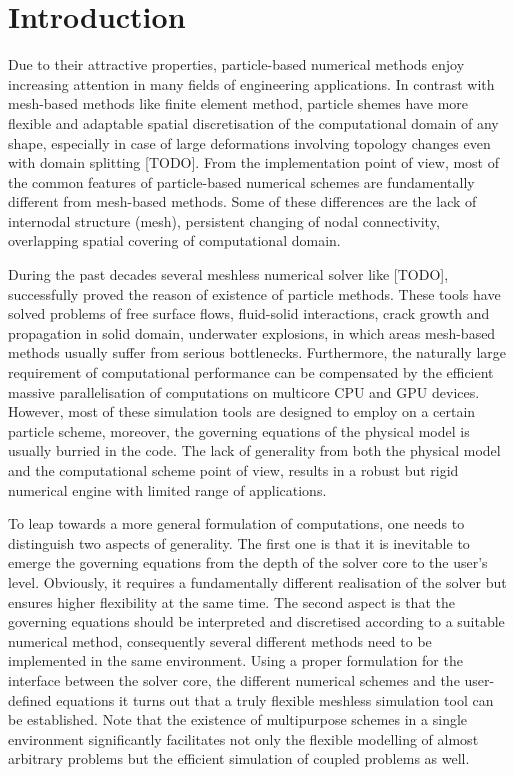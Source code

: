 \documentclass[a4paper,12pt,openany]{book}
\theoremstyle{break}
\begin{document}
\section{Introduction}
Due to their attractive properties, particle-based numerical methods enjoy increasing attention in many fields of engineering applications. In contrast with mesh-based methods  like finite element method, particle shemes have more flexible and adaptable spatial discretisation of the computational domain of any shape, especially in case of large deformations involving topology changes even with domain splitting [TODO].
From the implementation point of view, most of the common features of particle-based numerical schemes are fundamentally different from mesh-based methods. Some of these differences are the lack of internodal structure (mesh), persistent changing of nodal connectivity, overlapping spatial covering of computational domain.

During the past decades several meshless numerical solver like [TODO], successfully proved the reason of existence of particle methods. These tools have solved problems of free surface flows, fluid-solid interactions, crack growth and propagation in solid domain, underwater explosions, in which areas mesh-based methods usually suffer from serious bottlenecks. Furthermore, the naturally large requirement of computational performance can be compensated by the efficient massive parallelisation of computations on multicore CPU and GPU devices. However, most of these simulation tools are designed to employ on a certain particle scheme, moreover, the governing equations of the physical model is usually burried in the code. The lack of generality from both the physical model and the computational scheme point of view, results in a robust but rigid numerical engine with limited range of applications. %

To leap towards a more general formulation of computations, one needs to distinguish two aspects of generality. The first one is that it is inevitable to emerge the governing equations from the depth of the solver core to the user's level. Obviously, it requires a fundamentally different realisation of the solver but ensures higher flexibility at the same time. The second aspect is that the governing equations should be interpreted and discretised according to a suitable numerical method, consequently several different methods need to be implemented in the same environment. Using a proper formulation for the interface between the solver core, the different numerical schemes and the user-defined equations it turns out that a truly flexible meshless simulation tool can be established. Note that the existence of multipurpose schemes in a single environment significantly facilitates  not only the flexible modelling of almost arbitrary problems but the efficient simulation of coupled problems as well.
\end{document}
